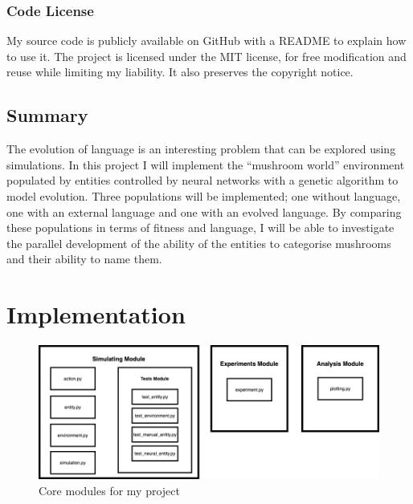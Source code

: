 \documentclass[12pt,a4paper,twoside,openright]{report}
\begin{document}
\subsection{Code License}

My source code is publicly available on GitHub with a README to explain how to use it. The project is licensed under the MIT license, for free modification and reuse while limiting my liability. It also preserves the copyright notice.

\section{Summary}\label{section:summary}

The evolution of language is an interesting problem that can be explored using simulations. In this project I will implement the ``mushroom world'' environment populated by entities controlled by neural networks with a genetic algorithm to model evolution. Three populations will be implemented; one without language, one with an external language and one with an evolved language. By comparing these populations in terms of fitness and language, I will be able to investigate the parallel development of the ability of the entities to categorise mushrooms and their ability to name them.


\chapter{Implementation}

\begin{figure}[t]
  \centering
  \includegraphics[width=.9\linewidth]{figs/modules}
  \caption{Core modules for my project}
  \label{fig:modules}
\end{figure}
\end{document}
